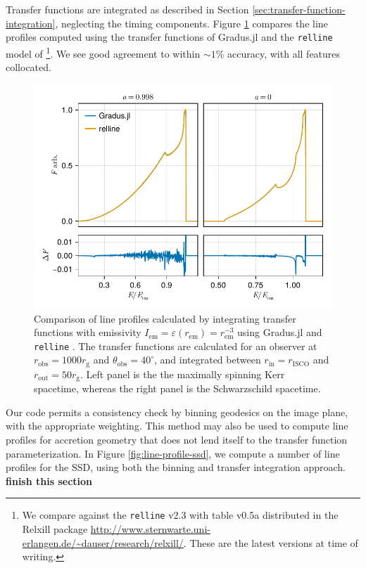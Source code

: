 \documentclass[fleqn,usenatbib]{mnras}
\newcommand{\todo}[1]{{\bf \color{red} #1}}
\newcommand{\Gradus}{Gradus.jl }
\newcommand{\relline}{\texttt{relline} }
\newcommand{\rg}{r_\text{g}}
\newcommand{\risco}{r_\text{ISCO}}
\begin{document}
Transfer functions are integrated as described in Section \ref{sec:transfer-function-integration}, neglecting the timing components. Figure \ref{fig:relline-comparison} compares the line profiles computed using the transfer functions of \Gradus and the \relline model of \cite{dauser_broad_2010}\footnote{We compare against the \relline v2.3 with table v0.5a distributed in the Relxill package \url{http://www.sternwarte.uni-erlangen.de/~dauser/research/relxill/}. These are the latest versions at time of writing.}. We see good agreement to within $\sim 1\%$ accuracy, with all features collocated.

\begin{figure}
	\centering
	\includegraphics[width=0.99\linewidth]{figures/lineprofiles.comparison.pdf}
	\caption{Comparison of line profiles calculated by integrating transfer functions with emissivity $I_\text{em} = \varepsilon(r_\text{em}) = r_\text{em}^{-3}$ using \Gradus and \relline. The transfer functions are calculated for an observer at $r_\text{obs} = 1000\rg$ and $\theta_\text{obs} = 40^\circ$, and integrated between $r_\text{in} = \risco$ and $r_\text{out} = 50 \rg$. Left panel is the the maximally spinning Kerr spacetime, whereas the right panel is the Schwarzschild spacetime.}
	\label{fig:relline-comparison}
\end{figure}

Our code permits a consistency check by binning geodesics on the image plane, with the appropriate weighting. This method may also be used to compute line profiles for accretion geometry that does not lend itself to the transfer function parameterization. In Figure \ref{fig:line-profile-ssd}, we compute a number of line profiles for the SSD, using both the binning and transfer integration approach. \todo{finish this section}
\end{document}
